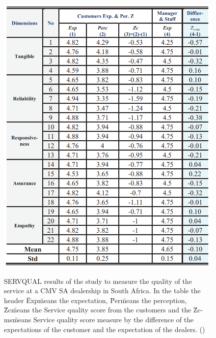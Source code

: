 \begin{figure}[h]
  \caption{SERVQUAL results of the study to measure the quality of the service at a CMV SA dealership in South Africa. In the table the header \"Exp\" means the expectation, \"Per\" means the perception, \"Zc\" means the Service quality score from the customers and the \"Zc-ms\" means Service quality score measure by the difference of the expectations of the customer and the expectation of the dealers. (\cite{Measuring_After_sales_Service_Quality})}
  \centering
  \includegraphics[width=\textwidth]{figs/SERVQUAL_results}
  \label{fig:SERVQUAL_results}
\end{figure}

